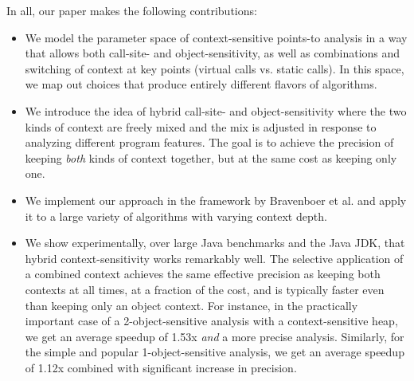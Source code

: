 


In all, our paper makes the following contributions:

\begin{itemize}
\item We model the parameter space of context-sensitive points-to
  analysis in a way that allows both call-site- and
  object-sensitivity, as well as combinations and switching of context
  at key points (virtual calls vs. static calls). In this space, we
  map out choices that produce entirely different flavors of
  algorithms.

\item We introduce the idea of hybrid call-site- and
  object-sensitivity where the two kinds of context are freely mixed
  and the mix is adjusted in response to analyzing different program
  features. The goal is to achieve the precision of keeping
  \emph{both} kinds of context together, but at the same cost as
  keeping only one.

\item We implement our approach in the \doop{} framework
  by Bravenboer et al. \cite{BS-OOPSLA09} and apply it to a large
  variety of algorithms with varying context depth.

\item We show experimentally, over large Java benchmarks and the Java
  JDK, that hybrid context-sensitivity works remarkably well. 
  The selective application of a combined context achieves the same
  effective precision as keeping both contexts at all times, at a
  fraction of the cost, and is typically faster even than keeping only
  an object context. For instance, in the practically important case
  of a 2-object-sensitive analysis with a context-sensitive heap, we
  get an average speedup of 1.53x \emph{and} a more precise
  analysis. Similarly, for the simple and popular 1-object-sensitive
  analysis, we get an average speedup of 1.12x combined with significant
  increase in precision.

\end{itemize}


